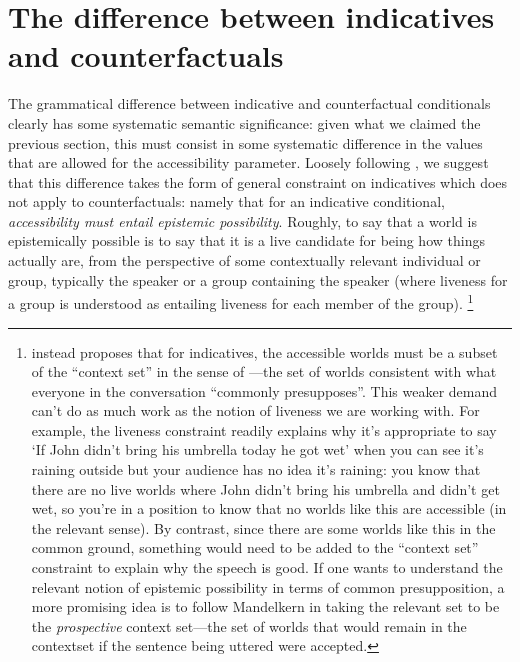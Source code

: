 \documentclass[If.tex]{subfiles}
\begin{document}
\section{The difference between indicatives and counterfactuals} 
\label{sect:indcf}
The grammatical difference between indicative and counterfactual conditionals clearly has some systematic semantic significance: given what we claimed the previous section, this must consist in some systematic difference in the values that are allowed for the accessibility parameter.  Loosely following \citet{vonFintelPSC}, we suggest that this difference takes the form of general constraint on indicatives which does not apply to counterfactuals: namely that for an indicative conditional, \emph{accessibility must entail epistemic possibility}.  Roughly, to say that a world is epistemically possible is to say that it is a live candidate for being how things actually are, from the perspective of some contextually relevant individual or group, typically the speaker or a group containing the speaker (where liveness for a group is understood as entailing liveness for each member of the group).%
\footnote{\citet{vonFintelPSC} instead proposes that for indicatives, the accessible worlds must be a subset of the “context set” in the sense of \cite{StalnakerAssertion}---the set of worlds consistent with what everyone in the conversation “commonly presupposes”.  This weaker demand can't do as much work as the notion of liveness we are working with.  For example, the liveness constraint readily explains why it's appropriate to say ‘If John didn't bring his umbrella today he got wet’ when you can see it's raining outside but your audience has no idea it's raining: you know that there are no live worlds where John didn't bring his umbrella and didn't get wet, so you're in a position to know that no worlds like this are accessible (in the relevant sense).  By contrast, since there are some worlds like this in the common ground, something would need to be added to the “context set” constraint to explain why the speech is good.  If one wants to understand the relevant notion of epistemic possibility in terms of common presupposition, a more promising idea is to follow Mandelkern in taking the relevant set to be the \emph{prospective} context set---the set of worlds that would remain in the contextset if the sentence being uttered were accepted.}
\end{document}
